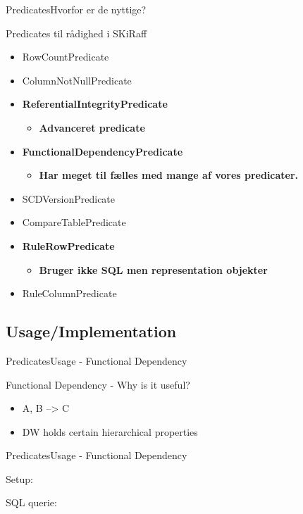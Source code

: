 \begin{frame}{Predicates}{Hvorfor er de nyttige?}
	\begin{block}{Predicates til rådighed i SKiRaff}
		\begin{itemize}
			\item<1-> RowCountPredicate
			\item<1-> ColumnNotNullPredicate
			\item<1-> \textbf{ReferentialIntegrityPredicate}
				\begin{itemize}
					\item<1-> \textbf{Advanceret predicate}
				\end{itemize}
			\item<1-> \textbf{FunctionalDependencyPredicate}
				\begin{itemize}
					\item<1-> \textbf{Har meget til fælles med mange af vores predicater.}
				\end{itemize}			
			\item<1-> SCDVersionPredicate
			\item<1-> CompareTablePredicate
			\item<1-> \textbf{RuleRowPredicate}
				\begin{itemize}
					\item<1-> \textbf{Bruger ikke SQL men representation objekter}
				\end{itemize}
			\item<1-> RuleColumnPredicate
		\end{itemize}
	\end{block}
\end{frame}

\subsection{Usage/Implementation }
\begin{frame}{Predicates}{Usage - Functional Dependency}
	\begin{block}{Functional Dependency - Why is it useful?}
		\begin{itemize}
			\item<1-> A, B --> C
			\item<2-> DW holds certain hierarchical properties
		\end{itemize}
	\end{block}
\end{frame}

\begin{frame}{Predicates}{Usage - Functional Dependency}
	\begin{block}{Setup:}
	\end{block}
	\begin{block}{SQL querie:}
	\end{block}
\end{frame}


